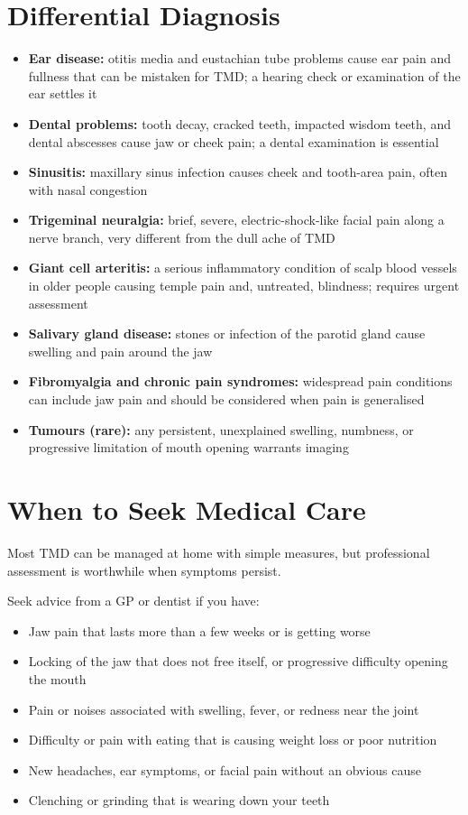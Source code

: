 \section*{Differential Diagnosis}
\begin{itemize}
    \item \textbf{Ear disease:} otitis media and eustachian tube problems cause ear pain and fullness that can be mistaken for TMD; a hearing check or examination of the ear settles it
    \item \textbf{Dental problems:} tooth decay, cracked teeth, impacted wisdom teeth, and dental abscesses cause jaw or cheek pain; a dental examination is essential
    \item \textbf{Sinusitis:} maxillary sinus infection causes cheek and tooth-area pain, often with nasal congestion
    \item \textbf{Trigeminal neuralgia:} brief, severe, electric-shock-like facial pain along a nerve branch, very different from the dull ache of TMD
    \item \textbf{Giant cell arteritis:} a serious inflammatory condition of scalp blood vessels in older people causing temple pain and, untreated, blindness; requires urgent assessment
    \item \textbf{Salivary gland disease:} stones or infection of the parotid gland cause swelling and pain around the jaw
    \item \textbf{Fibromyalgia and chronic pain syndromes:} widespread pain conditions can include jaw pain and should be considered when pain is generalised
    \item \textbf{Tumours (rare):} any persistent, unexplained swelling, numbness, or progressive limitation of mouth opening warrants imaging
\end{itemize}

\section*{When to Seek Medical Care}
Most TMD can be managed at home with simple measures, but professional assessment is worthwhile when symptoms persist.

Seek advice from a GP or dentist if you have:
\begin{itemize}
    \item Jaw pain that lasts more than a few weeks or is getting worse
    \item Locking of the jaw that does not free itself, or progressive difficulty opening the mouth
    \item Pain or noises associated with swelling, fever, or redness near the joint
    \item Difficulty or pain with eating that is causing weight loss or poor nutrition
    \item New headaches, ear symptoms, or facial pain without an obvious cause
    \item Clenching or grinding that is wearing down your teeth
\end{itemize}

